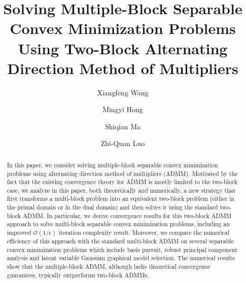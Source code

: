 \documentclass{mcom-l}
\theoremstyle{definition}
\theoremstyle{remark}
\numberwithin{equation}{section}
\begin{document}
\title[Solving Multiple-Block Separable Problems Using Two-Block ADMM]{Solving Multiple-Block Separable Convex Minimization Problems Using Two-Block Alternating Direction Method of Multipliers}

\author{Xiangfeng Wang}
\address{Department of Mathematics, Nanjing University, 22 Hankou Road, Nanjing, 210093, P.R. China.}

\author{Mingyi Hong}
\address{Department of Electrical and Computer Engineering, University of Minnesota, Minneapolis, 55455, USA.}

\author{Shiqian Ma}
\address{Department of Systems Engineering and Engineering Management, The Chinese University of Hong Kong, Shatin, N. T., Hong Kong.}

\author{Zhi-Quan Luo}
\address{Department of Electrical and Computer Engineering, University of Minnesota, Minneapolis, 55455, USA.}


\date{}

\dedicatory{}

\begin{abstract}
In this paper, we consider solving multiple-block separable convex minimization problems using alternating direction method of multipliers (ADMM). Motivated by the fact that the existing convergence theory for ADMM is mostly limited to the two-block case, we analyze in this paper, both  theoretically and numerically, a new strategy that first transforms a multi-block problem  into an equivalent two-block problem (either in the primal domain or in the dual domain) and then solves it using the standard two-block ADMM. In particular, we derive convergence results for this two-block ADMM approach to solve multi-block separable convex minimization problems, including an improved $\mathcal{O}(1/\epsilon)$ iteration complexity result. Moreover, we compare the numerical efficiency of this approach with  the standard multi-block ADMM on several separable convex minimization problems which include basis pursuit, robust principal component analysis and latent variable Gaussian graphical model selection. The numerical results show that the multiple-block ADMM, although lacks theoretical convergence guarantees, typically outperforms two-block ADMMs.
\end{abstract}
\end{document}
